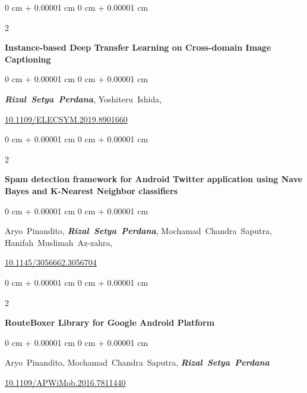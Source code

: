 \documentclass[10pt, letterpaper]{article}
\newenvironment{onecolentry}{
    \begin{adjustwidth}{
        0 cm + 0.00001 cm
    }{
        0 cm + 0.00001 cm
    }
}{
    \end{adjustwidth}
} %
\newenvironment{twocolentry}[2][]{
    \onecolentry
    \def\secondColumn{#2}
    \setcolumnwidth{\fill, 4.5 cm}
    \begin{paracol}{2}
}{
    \switchcolumn \raggedleft \secondColumn
    \end{paracol}
    \endonecolentry
} %
\begin{document}
        \vspace{0.3 cm}
        \begin{samepage}
            \begin{twocolentry}{2019}
                \textbf{Instance-based Deep Transfer Learning on Cross-domain Image Captioning}
            \end{twocolentry}
            \vspace{0.10 cm}
            \begin{onecolentry}
                \mbox{\textbf{\textit{Rizal Setya Perdana}}},
                \mbox{Yoshiteru Ishida},
                \vspace{0.10 cm}
                
                \href{https://doi.org/10.1109/ELECSYM.2019.8901660}{10.1109/ELECSYM.2019.8901660}
            \end{onecolentry}
        \end{samepage}
        \vspace{0.3 cm}
        \begin{samepage}
            \begin{twocolentry}{2017}
                \textbf{Spam detection framework for Android Twitter application using Nave Bayes and K-Nearest Neighbor classifiers}
            \end{twocolentry}
            \vspace{0.10 cm}
            \begin{onecolentry}
                \mbox{Aryo Pinandito},
                \mbox{\textbf{\textit{Rizal Setya Perdana}}},
                \mbox{Mochamad Chandra Saputra},
                \mbox{Hanifah Muslimah Az-zahra},
                \vspace{0.10 cm}
                
                \href{https://doi.org/10.1145/3056662.3056704}{10.1145/3056662.3056704}
            \end{onecolentry}
        \end{samepage}
        \vspace{0.3 cm}
        \begin{samepage}
            \begin{twocolentry}{2016}
                \textbf{RouteBoxer Library for Google Android Platform}
            \end{twocolentry}
            \vspace{0.10 cm}
            \begin{onecolentry}
                \mbox{Aryo Pinandito},
                \mbox{Mochamad Chandra Saputra},
                \mbox{\textbf{\textit{Rizal Setya Perdana}}}
                \vspace{0.10 cm}
                
                \href{https://doi.org/10.1109/APWiMob.2016.7811440}{10.1109/APWiMob.2016.7811440}
            \end{onecolentry}
        \end{samepage}
\end{document}
